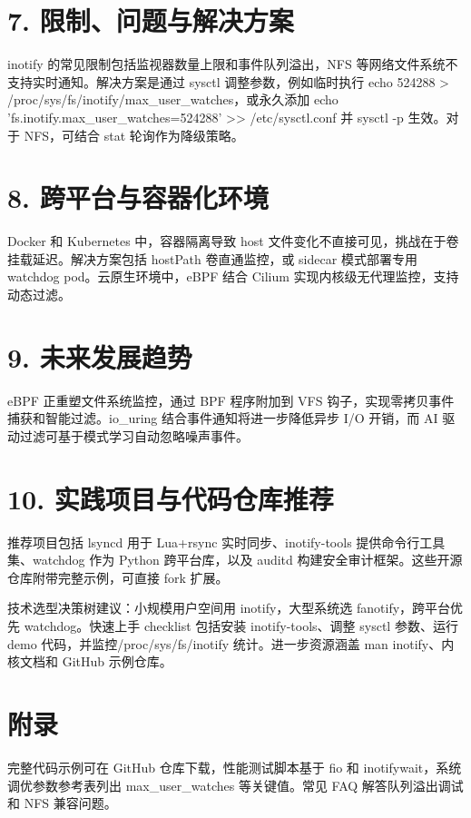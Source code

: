 \chapter{7. 限制、问题与解决方案}
inotify 的常见限制包括监视器数量上限和事件队列溢出，NFS 等网络文件系统不支持实时通知。解决方案是通过 sysctl 调整参数，例如临时执行 echo 524288 > /proc/sys/fs/inotify/max\_{}user\_{}watches，或永久添加 echo 'fs.inotify.max\_{}user\_{}watches=524288' >> /etc/sysctl.conf 并 sysctl -p 生效。对于 NFS，可结合 stat 轮询作为降级策略。\par
\chapter{8. 跨平台与容器化环境}
Docker 和 Kubernetes 中，容器隔离导致 host 文件变化不直接可见，挑战在于卷挂载延迟。解决方案包括 hostPath 卷直通监控，或 sidecar 模式部署专用 watchdog pod。云原生环境中，eBPF 结合 Cilium 实现内核级无代理监控，支持动态过滤。\par
\chapter{9. 未来发展趋势}
eBPF 正重塑文件系统监控，通过 BPF 程序附加到 VFS 钩子，实现零拷贝事件捕获和智能过滤。io\_{}uring 结合事件通知将进一步降低异步 I/O 开销，而 AI 驱动过滤可基于模式学习自动忽略噪声事件。\par
\chapter{10. 实践项目与代码仓库推荐}
推荐项目包括 lsyncd 用于 Lua+rsync 实时同步、inotify-tools 提供命令行工具集、watchdog 作为 Python 跨平台库，以及 auditd 构建安全审计框架。这些开源仓库附带完整示例，可直接 fork 扩展。\par
技术选型决策树建议：小规模用户空间用 inotify，大型系统选 fanotify，跨平台优先 watchdog。快速上手 checklist 包括安装 inotify-tools、调整 sysctl 参数、运行 demo 代码，并监控/proc/sys/fs/inotify 统计。进一步资源涵盖 man inotify、内核文档和 GitHub 示例仓库。\par
\chapter{附录}
完整代码示例可在 GitHub 仓库下载，性能测试脚本基于 fio 和 inotifywait，系统调优参数参考表列出 max\_{}user\_{}watches 等关键值。常见 FAQ 解答队列溢出调试和 NFS 兼容问题。\par
